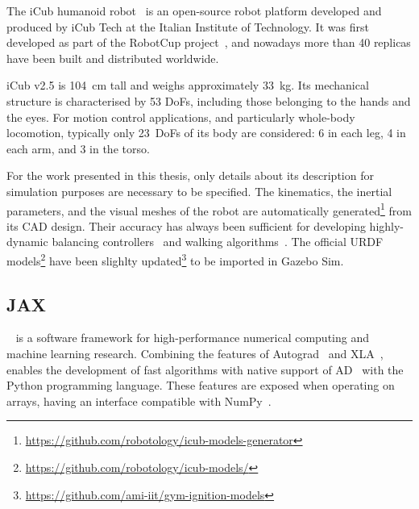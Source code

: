 The iCub humanoid robot~\parencite{natale_icub_2017} is an open-source robot platform developed and produced by iCub Tech at the Italian Institute of Technology.
It was first developed as part of the RobotCup project~\parencite{metta_open_2005}, and nowadays more than 40 replicas have been built and distributed worldwide.

iCub v2.5 is 104~cm tall and weighs approximately 33~kg.
Its mechanical structure is characterised by 53 \acp{DoF}, including those belonging to the hands and the eyes.
For motion control applications, and particularly whole-body locomotion, typically only 23~\acp{DoF} of its body are considered: 6 in each leg, 4 in each arm, and 3 in the torso.

For the work presented in this thesis, only details about its description for simulation purposes are necessary to be specified.
The kinematics, the inertial parameters, and the visual meshes of the robot are automatically generated\footnote{\url{https://github.com/robotology/icub-models-generator}} from its CAD design.
Their accuracy has always been sufficient for developing highly-dynamic balancing controllers~\parencite{pucci_highly_2016} and walking algorithms~\parencite{dafarra_control_2018}.
The official \ac{URDF} models\footnote{\url{https://github.com/robotology/icub-models/}} have been slighlty updated\footnote{\url{https://github.com/ami-iit/gym-ignition-models}} to be imported in Gazebo Sim.

\subsection{JAX}

\jax~\parencite{frostig_compiling_2018, bradbury_james_jax_2018} is a software framework for high-performance numerical computing and machine learning research.
Combining the features of Autograd~\parencite{maclaurin_autograd_2015} and \ac{XLA}~\parencite{sabne_xla_2020}, \jax enables the development of fast algorithms with native support of \ac{AD}~\parencite{baydin_automatic_2018} with the Python programming language.
These features are exposed when operating on \jax arrays, having an interface compatible with NumPy~\parencite{harris_array_2020}.


